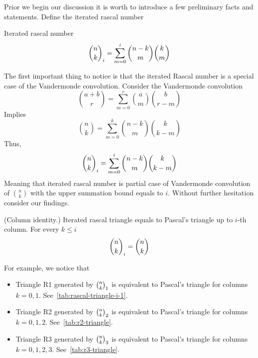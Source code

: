 ﻿Prior we begin our discussion it is worth to introduce a few preliminary facts and statements.
Define the iterated rascal number~\cite[eq. 3.2]{gregory2022iterated_Aequationes}
\begin{definition}
    Iterated rascal number
    \begin{align}
        \binom{n}{k}_{i} = \sum_{m=0}^{i} \binom{n-k}{m} \binom{k}{m}
    \end{align}
\end{definition}
The first important thing to notice is that the iterated Rascal number is a special case of the Vandermonde convolution.
Consider the Vandermonde convolution~\cite{andrews1999special}
\begin{equation*}
    \binom{a+b}{r} = \sum_{m=0}^{r} \binom{a}{m} \binom{b}{r-m}
\end{equation*}
Implies
\begin{equation*}
    \binom{n}{k} = \sum_{m=0}^{k} \binom{n-k}{m} \binom{k}{k-m}
\end{equation*}
Thus,
\begin{equation}
    \binom{n}{k}_{i} = \sum_{m=0}^{i} \binom{n-k}{m} \binom{k}{k-m}
    \label{eq:rascal-vandermonde-convolution}
\end{equation}
Meaning that iterated rascal number is partial case of Vandermonde convolution of $\binom{n}{k}$
with the upper summation bound equals to $i$.
Without further hesitation consider our findings.
\begin{proposition}
    \label{prop:rascal-binomial-identity-for-i}
    (Column identity.)
    Iterated rascal triangle equals to Pascal's triangle up to $i$-th column.
    For every $k\leq i$
    \begin{equation}
        \binom{n}{k}_{i} = \binom{n}{k}
        \label{eq:rascal-column-identity}
    \end{equation}
\end{proposition}
For example, we notice that
\begin{itemize}
    \item Triangle R1 generated by $\binom{n}{k}_{1}$ is equivalent to Pascal's triangle for columns $k=0,1$.
    See~\eqref{tab:rascal-triangle-i-1}.
    \item Triangle R2 generated by $\binom{n}{k}_{2}$ is equivalent to Pascal's triangle for columns $k=0,1,2$.
    See~\eqref{tab:r2-triangle}.
    \item Triangle R3 generated by $\binom{n}{k}_{3}$ is equivalent to Pascal's triangle for columns $k=0,1,2,3$.
    See~\eqref{tab:r3-triangle}.
\end{itemize}
